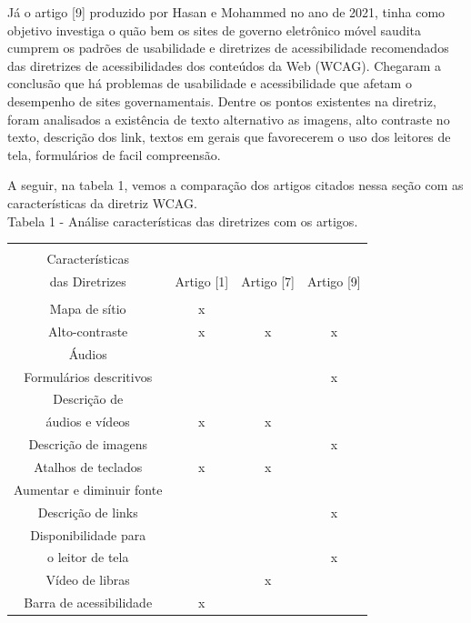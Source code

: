 \documentclass[a4paper]{article}
\begin{document}
\begin{titlepage}
Já o artigo [9] produzido por Hasan e Mohammed no ano de 2021, tinha como objetivo investiga o quão bem os sites de governo eletrônico móvel saudita cumprem os padrões de usabilidade e diretrizes de acessibilidade recomendados das diretrizes de acessibilidades dos conteúdos da Web (WCAG). Chegaram a conclusão que há problemas de usabilidade e acessibilidade que afetam o desempenho de sites governamentais. Dentre os pontos existentes na diretriz, foram analisados a existência de texto alternativo as imagens, alto contraste no texto, descrição dos link, textos em gerais que favorecerem o uso dos leitores de tela, formulários de facil compreensão.

A seguir, na tabela 1, vemos a comparação dos artigos citados nessa seção com as características da diretriz WCAG.\\[0.5cm]

Tabela 1 - Análise características das diretrizes com os artigos.
\begin{center}
	\begin{tabular}{cccc}
		\hline \\[0.2cm]
		Características\\[0.1cm] das Diretrizes & Artigo [1] & Artigo [7] & Artigo [9]\\[0.2cm]
		\hline \\[0.2cm]
		Mapa de sítio & x & & \\[0.2cm]
		Alto-contraste & x & x & x\\[0.2cm]
		Áudios & & &  \\[0.2cm]
		Formulários descritivos & & & x \\[0.2cm]
		Descrição de\\áudios e vídeos & x & x & \\[0.2cm]
		Descrição de imagens & & & x \\[0.2cm]
		Atalhos de teclados & x & x & \\[0.2cm]
		Aumentar e diminuir fonte & & & \\[0.2cm]
		Descrição de links & & & x \\[0.2cm]
		Disponibilidade para\\o leitor de tela & & & x \\[0.2cm]
		Vídeo de libras & & x & \\[0.2cm]
		Barra de acessibilidade & x & & \\[0.2cm]
		\hline
	\end{tabular}
\end{center}


\end{titlepage}
\end{document}
